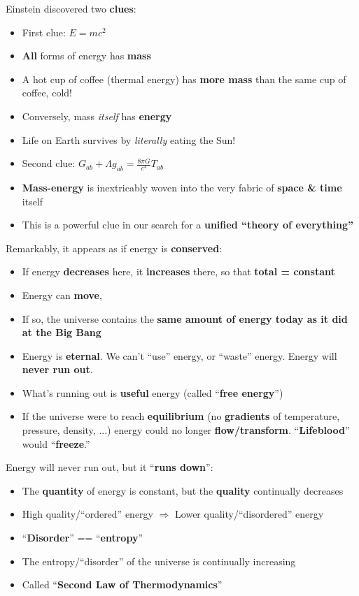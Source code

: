 \documentclass[12pt]{article}
\theoremstyle{definition}
\begin{document}
Einstein discovered two \textbf{clues}:
\begin{itemize}
  \item First clue: $E = mc^{2}$
  \item \textbf{All} forms of energy has \textbf{mass}
  \item A hot cup of coffee (thermal energy) has \textbf{more mass} than the same cup of coffee, cold!
  \bigskip
  \item Conversely, mass \emph{itself} has \textbf{energy}
  \item Life on Earth survives by \emph{literally} eating the Sun!
  \bigskip
  \item Second clue: $G_{ab} + \Lambda g_{ab} = \frac{8\pi G}{c^{4}}T_{ab}$
  \item \textbf{Mass-energy} is inextricably woven into the very fabric of \textbf{space \& time} itself
  \item This is a powerful clue in our search for a \textbf{unified ``theory of everything''}
\end{itemize}

Remarkably, it appears as if energy is \textbf{conserved}:
\begin{itemize}
  \item If energy \textbf{decreases} here, it \textbf{increases} there, so that \textbf{total = constant}
  \item Energy can \textbf{move},
  \item If so, the universe contains the \textbf{same amount of energy today as it did at the Big Bang}
  \item Energy is \textbf{eternal}.
  We can't ``use'' energy, or ``waste'' energy.
  Energy will \textbf{never run out}.
  \item What's running out is \textbf{useful} energy (called ``\textbf{free energy}'')
  \item If the universe were to reach \textbf{equilibrium} (no \textbf{gradients} of temperature, pressure, density, ...) energy could no longer \textbf{flow/transform}.
  ``\textbf{Lifeblood}'' would ``\textbf{freeze}.''
\end{itemize}

Energy will never run out, but it ``\textbf{runs down}'':
\begin{itemize}
  \item The \textbf{quantity} of energy is constant, but the \textbf{quality} continually decreases
  \item High quality/``ordered'' energy $\Rightarrow$ Lower quality/``disordered'' energy
  \item ``\textbf{Disorder}'' == ``\textbf{entropy}''
  \item The entropy/``disorder'' of the universe is continually increasing
  \item Called ``\textbf{Second Law of Thermodynamics}''
\end{itemize}
\end{document}
